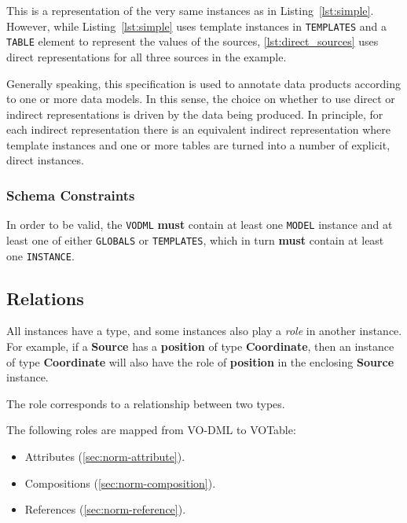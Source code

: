\documentclass[11pt,a4paper]{ivoa}
\begin{document}
This is a representation of the very same instances as in
Listing~\ref{lst:simple}. However, while Listing~\ref{lst:simple} uses template
instances in \texttt{TEMPLATES} and a \texttt{TABLE} element to
represent the values of the sources, \ref{lst:direct_sources} uses
direct representations for all three sources in the example.

Generally speaking, this specification is used to annotate data products
according to one or more data models. In this sense, the choice on
whether to use direct or indirect representations is driven by the data
being produced. In principle, for each indirect representation there is
an equivalent indirect representation where template instances and one
or more tables are turned into a number of explicit, direct instances.

\subsubsection{Schema Constraints}\label{schema-constraints}

In order to be valid, the \texttt{VODML} \textbf{must} contain at least
one \texttt{MODEL} instance and at least one of either \texttt{GLOBALS}
or \texttt{TEMPLATES}, which in turn \textbf{must} contain at least one
\texttt{INSTANCE}.

\subsection{Relations}\label{sec:norm-relations}

All instances have a type, and some instances also play a \emph{role} in
another instance. For example, if a \textbf{Source} has a
\textbf{position} of type \textbf{Coordinate}, then an instance of type
\textbf{Coordinate} will also have the role of \textbf{position} in the
enclosing \textbf{Source} instance.

The role corresponds to a relationship between two types.

The following roles are mapped from VO-DML to VOTable:

\begin{itemize}
\itemsep1pt\parskip0pt
\item
  Attributes (\ref{sec:norm-attribute}).
\item
  Compositions (\ref{sec:norm-composition}).
\item
  References (\ref{sec:norm-reference}).
\end{itemize}
\end{document}
